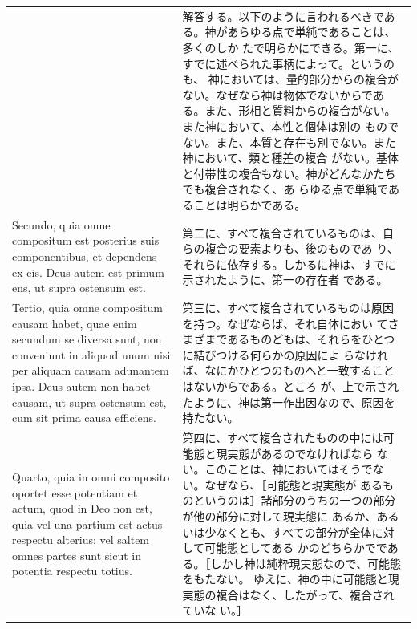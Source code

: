 \documentclass[paper=a4paper,fontsize=10pt,jafontsize=9pt,titlepage]{jlreq}
\begin{document}
\begin{longtable}{p{21em}p{21em}}
&

解答する。以下のように言われるべきである。神があらゆる点で単純であることは、多くのしか
 たで明らかにできる。第一に、すでに述べられた事柄によって。というのも、
 神においては、量的部分からの複合がない。なぜなら神は物体でないからであ
 る。また、形相と質料からの複合がない。また神において、本性と個体は別の
 ものでない。また、本質と存在も別でない。また神において、類と種差の複合
 がない。基体と付帯性の複合もない。神がどんなかたちでも複合されなく、あ
 らゆる点で単純であることは明らかである。

\\


Secundo, quia omne compositum est posterius suis componentibus, et
 dependens ex eis. Deus autem est primum ens, ut supra ostensum est.

&

第二に、すべて複合されているものは、自らの複合の要素よりも、後のものであ
 り、それらに依存する。しかるに神は、すでに示されたように、第一の存在者
 である。

\\

Tertio, quia omne compositum causam habet, quae enim secundum se diversa
 sunt, non conveniunt in aliquod unum nisi per aliquam causam adunantem
 ipsa. Deus autem non habet causam, ut supra ostensum est, cum sit prima
 causa efficiens.

&

第三に、すべて複合されているものは原因を持つ。なぜならば、それ自体におい
 てさまざまであるものどもは、それらをひとつに結びつける何らかの原因によ
 らなければ、なにかひとつのものへと一致することはないからである。ところ
 が、上で示されたように、神は第一作出因なので、原因を持たない。

\\

Quarto, quia in omni composito oportet esse potentiam et actum, quod in
 Deo non est, quia vel una partium est actus respectu alterius; vel
 saltem omnes partes sunt sicut in potentia respectu totius.

&

第四に、すべて複合されたものの中には可能態と現実態があるのでなければなら
 ない。このことは、神においてはそうでない。なぜなら、［可能態と現実態が
 あるものというのは］諸部分のうちの一つの部分が他の部分に対して現実態に
 あるか、あるいは少なくとも、すべての部分が全体に対して可能態としてある
 かのどちらかでである。［しかし神は純粋現実態なので、可能態をもたない。
 ゆえに、神の中に可能態と現実態の複合はなく、したがって、複合されていな
 い。］


\end{longtable}
\end{document}
